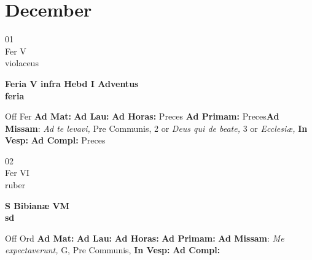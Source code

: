 \documentclass[10pt, openany]{book}
\begin{document}
    \chapter{December}
                    
    \begin{center}
        \begin{minipage}{3.5in}
            \vspace{2em}
            \begin{minipage}{0.5in}
                {\Huge 01} \\
                {\normalsize Fer V} \\
                {\normalsize violaceus}
            \end{minipage}
            \begin{minipage}{3.0in}
                \textbf{ \large Feria V infra Hebd I Adventus \\
                \textnormal{\normalsize feria}} \\ 
            \end{minipage}
            \begin{justify}Off Fer
                \textbf{Ad Mat: }
                \textbf{Ad Lau: }
                \textbf{Ad Horas: }Preces
                \textbf{Ad Primam: }Preces\textbf{Ad Missam}: \textit{Ad te levavi,} Pre Communis, 2 or \textit{Deus qui de beate,} 3 or \textit{Ecclesiæ,}  
                \textbf{In Vesp: }
                \textbf{Ad Compl: }Preces
            \end{justify}
        \end{minipage}
    \end{center}

    \begin{center}
        \begin{minipage}{3.5in}
            \vspace{2em}
            \begin{minipage}{0.5in}
                {\Huge 02} \\
                {\normalsize Fer VI} \\
                {\normalsize ruber}
            \end{minipage}
            \begin{minipage}{3.0in}
                \textbf{ \large S Bibianæ VM \\
                \textnormal{\normalsize sd}} \\ 
            \end{minipage}
            \begin{justify}Off Ord
                \textbf{Ad Mat: }
                \textbf{Ad Lau: }
                \textbf{Ad Horas: }
                \textbf{Ad Primam: }\textbf{Ad Missam}: \textit{Me expectaverunt,} G, Pre Communis,  
                \textbf{In Vesp: }
                \textbf{Ad Compl: }
            \end{justify}
        \end{minipage}
    \end{center}
\end{document}
